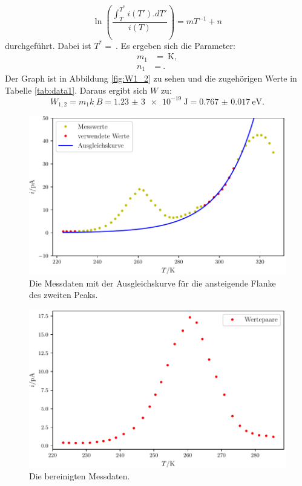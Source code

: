 \begin{equation}
\ln\left(\frac{\int_T^{T^*} i(T').dT'}{i(T)}\right) = mT^{-1}+n \label{eq:reg3}
\end{equation}
durchgeführt. Dabei ist $T^*=\SI{}{}$. Es ergeben sich die Parameter:
\begin{align*}
m_1&=\SI{}{\kelvin},\\
n_1&=\SI{}{}\text{.}
\end{align*}
Der Graph ist in Abbildung \ref{fig:W1_2} zu sehen und die zugehörigen Werte in Tabelle \ref{tab:data1}.
Daraus ergibt sich $W$ zu:
\[
W_{1,2} = m_1 k_.B =\SI{1,23(3)e-19}{\joule}=\SI{0.767(17)}{\electronvolt}\text{.}
\]

\begin{figure}
	\centering
	\includegraphics[width=\linewidth-60pt,height=\textheight-60pt,keepaspectratio]{content/images/plot1exp.pdf}
	\caption{Die Messdaten mit der Ausgleichskurve für die ansteigende Flanke des zweiten Peaks.}
	\label{fig:plot1exp}
\end{figure}

\begin{figure}
	\centering
	\includegraphics[width=\linewidth-60pt,height=\textheight-60pt,keepaspectratio]{content/images/bereinigt1.pdf}
	\caption{Die bereinigten Messdaten.}
	\label{fig:bereinigt1}
\end{figure}

